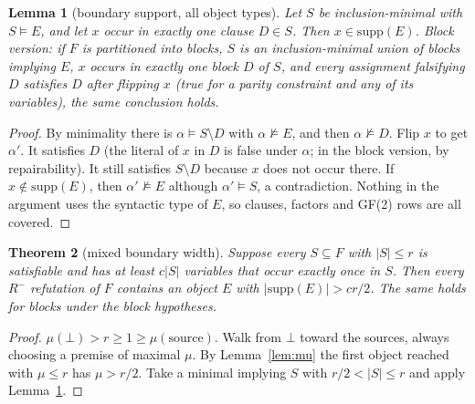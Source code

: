 \documentclass[11pt]{article}
\newtheorem{theorem}{Theorem}
\newtheorem{lemma}[theorem]{Lemma}
\begin{document}
\begin{lemma}[boundary support, all object types]\label{lem:boundary}
Let $S$ be inclusion-minimal with $S\models E$, and let $x$ occur in exactly one clause $D\in S$. Then $x\in\mathrm{supp}(E)$.
\emph{Block version:} if $F$ is partitioned into blocks, $S$ is an inclusion-minimal union of blocks implying $E$, $x$ occurs in exactly one block $D$ of $S$, and every assignment falsifying $D$ satisfies $D$ after flipping $x$ (true for a parity constraint and any of its variables), the same conclusion holds.
\end{lemma}
\begin{proof}
By minimality there is $\alpha\models S\setminus D$ with $\alpha\not\models E$, and then $\alpha\not\models D$. Flip $x$ to get $\alpha'$. It satisfies $D$ (the literal of $x$ in $D$ is false under $\alpha$; in the block version, by repairability). It still satisfies $S\setminus D$ because $x$ does not occur there. If $x\notin\mathrm{supp}(E)$, then $\alpha'\not\models E$ although $\alpha'\models S$, a contradiction. Nothing in the argument uses the syntactic type of $E$, so clauses, factors and GF(2) rows are all covered.
\end{proof}

\begin{theorem}[mixed boundary width]\label{thm:width}
Suppose every $S\subseteq F$ with $|S|\le r$ is satisfiable and has at least $c|S|$ variables that occur exactly once in $S$. Then every $R^-$ refutation of $F$ contains an object $E$ with $|\mathrm{supp}(E)|>cr/2$. The same holds for blocks under the block hypotheses.
\end{theorem}
\begin{proof}
$\mu(\bot)>r\ge 1\ge\mu(\text{source})$. Walk from $\bot$ toward the sources, always choosing a premise of maximal $\mu$. By Lemma~\ref{lem:mu} the first object reached with $\mu\le r$ has $\mu>r/2$. Take a minimal implying $S$ with $r/2<|S|\le r$ and apply Lemma~\ref{lem:boundary}.
\end{proof}
\end{document}
